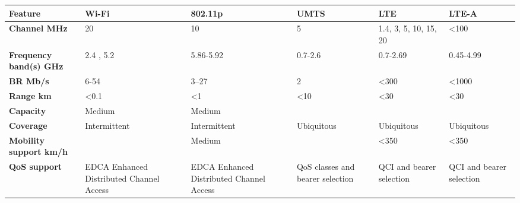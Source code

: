 \begin{table}[h!]
\scriptsize
	\begin{tabulary}{\columnwidth}{L|L|L|L|L|L}
	\bf{Feature}                     & \bf{Wi-Fi}                                            & \bf{802.11p}                                          & \bf{UMTS}                        & \textbf{LTE}                      & \textbf{LTE-A}  \\\hline
	\bf{Channel MHz}           & 20                                                    & 10                                                    & 5                                & 1.4, 3, 5, 10, 15, 20    & <100                 \\\hline
	\bf{Frequency band(s) GHz}       & 2.4 , 5.2                                             & 5.86-5.92                                             & 0.7-2.6                          & 0.7-2.69                 & 0.45-4.99                 \\\hline
	\bf{\ac{BR} Mb/s}               & 6-54                                                  & 3–27                                                  & 2                                & <300                & <1000                \\\hline
	\bf{Range km}                    & <0.1                                                  & <1                                               & <10                         & <30                 & <30                  \\\hline
	\bf{Capacity}                    & Medium                                                & Medium                                                & \ko                              & \ok                      & \ok                       \\\hline
	\bf{Coverage}                    & Intermittent                                          & Intermittent                                          & Ubiquitous                       & Ubiquitous               & Ubiquitous                \\\hline
	\bf{Mobility support km/h}       & \ko                                                   & Medium                                                & \ok                              & <350                & <350                 \\\hline
	\bf{QoS support}                 & EDCA \scriptsize{Enhanced Distributed Channel Access} & EDCA \scriptsize{Enhanced Distributed Channel Access} & QoS classes and bearer selection & QCI and bearer selection & QCI and bearer selection  \\\hline

\end{tabulary}
\end{table}
